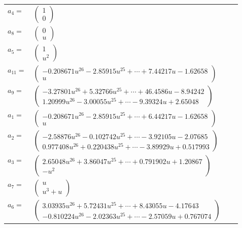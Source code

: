 \documentclass[1p]{elsarticle_modified}
\theoremstyle{definition}
\begin{document}
\begin{tabular}{m{7pt} m{180pt} m{7pt} m{180pt} }
\flushright $a_{4}=$&$\begin{pmatrix}1\\0\end{pmatrix}$ \\
\flushright $a_{8}=$&$\begin{pmatrix}0\\u\end{pmatrix}$ \\
\flushright $a_{5}=$&$\begin{pmatrix}1\\u^2\end{pmatrix}$ \\
\flushright $a_{11}=$&$\begin{pmatrix}-0.208671 u^{26}-2.85915 u^{25}+\cdots+7.44217 u-1.62658\\u\end{pmatrix}$ \\
\flushright $a_{9}=$&$\begin{pmatrix}-3.27801 u^{26}+5.32766 u^{25}+\cdots+46.4586 u-8.94242\\1.20999 u^{26}-3.00055 u^{25}+\cdots-9.39324 u+2.65048\end{pmatrix}$ \\
\flushright $a_{1}=$&$\begin{pmatrix}-0.208671 u^{26}-2.85915 u^{25}+\cdots+6.44217 u-1.62658\\u\end{pmatrix}$ \\
\flushright $a_{2}=$&$\begin{pmatrix}-2.58876 u^{26}-0.102742 u^{25}+\cdots-3.92105 u-2.07685\\0.977408 u^{26}+0.220438 u^{25}+\cdots-3.89929 u+0.517993\end{pmatrix}$ \\
\flushright $a_{3}=$&$\begin{pmatrix}2.65048 u^{26}+3.86047 u^{25}+\cdots+0.791902 u+1.20867\\- u^2\end{pmatrix}$ \\
\flushright $a_{7}=$&$\begin{pmatrix}u\\u^3+u\end{pmatrix}$ \\
\flushright $a_{6}=$&$\begin{pmatrix}3.03935 u^{26}+5.72431 u^{25}+\cdots+8.43055 u-4.17643\\-0.810224 u^{26}-2.02363 u^{25}+\cdots-2.57059 u+0.767074\end{pmatrix}$ \\

\end{tabular}
\end{document}
